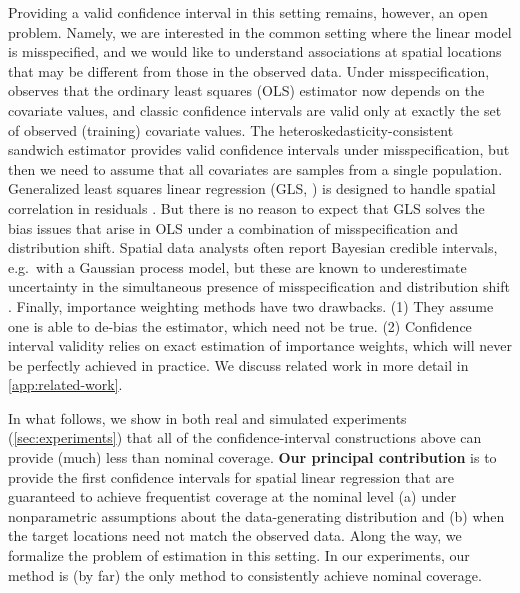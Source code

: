 Providing a valid confidence interval in this setting remains, however, an open problem. Namely, we are interested in the common setting where the linear model is misspecified, and we would like to understand associations at spatial locations that may be different from those in the observed data. Under misspecification, \citet{buja_models_2019} observes that the ordinary least squares (OLS) estimator now depends on the covariate values, and classic confidence intervals are valid only at exactly the set of observed (training) covariate values. The heteroskedasticity-consistent sandwich estimator \citep{huber_behavior_1967, white_heteroskedasticity-consistent_1980,white_1980_usingleastsquares, buja_models_2019} provides valid confidence intervals under misspecification, but then we need to assume that all covariates are samples from a single population. Generalized least squares linear regression (GLS, \citealt{aitken1936iv}) is designed to handle spatial correlation in residuals \citep[pages 22-24]{cressie2015statistics}. But there is no reason to expect that GLS solves the bias issues that arise in OLS under a combination of misspecification and distribution shift. Spatial data analysts often report Bayesian credible intervals, e.g.\ with a Gaussian process model, but these are known to underestimate uncertainty in the simultaneous presence of misspecification and distribution shift \citep{walker2013bayesian, muller_2013_risk}. Finally, importance weighting methods \citep{shimodaira_improving_2000} have two drawbacks. (1) They assume one is able to de-bias the estimator, which need not be true. (2) Confidence interval validity relies on exact estimation of importance weights, which will never be perfectly achieved in practice. We discuss related work in more detail in \cref{app:related-work}.

In what follows, we show in both real and simulated experiments (\cref{sec:experiments}) that all of the confidence-interval constructions above can provide (much) less than nominal coverage. \textbf{Our principal contribution} is to provide the first confidence intervals for spatial linear regression that are guaranteed to achieve frequentist coverage at the nominal level (a) under nonparametric assumptions about the data-generating distribution and (b) when the target locations need not match the observed data. Along the way, we formalize the problem of estimation in this setting. In our experiments, our method is (by far) the only method to consistently achieve nominal coverage.

